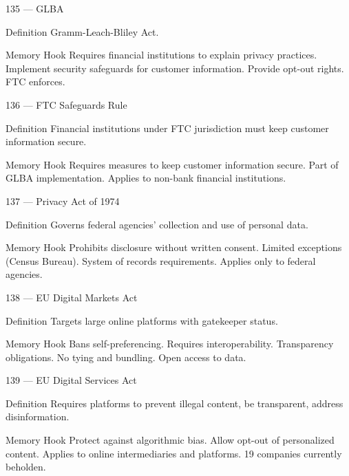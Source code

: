 \documentclass[aspectratio=169,8pt]{beamer}
\begin{document}
	\begin{frame}{135 --- GLBA}
		\begin{block}{Definition}
			Gramm-Leach-Bliley Act.
		\end{block}
		\begin{block}{Memory Hook}
			Requires financial institutions to explain privacy practices. Implement security safeguards for customer information. Provide opt-out rights. FTC enforces.
		\end{block}
	\end{frame}
	
	\begin{frame}{136 --- FTC Safeguards Rule}
		\begin{block}{Definition}
			Financial institutions under FTC jurisdiction must keep customer information secure.
		\end{block}
		\begin{block}{Memory Hook}
			Requires measures to keep customer information secure. Part of GLBA implementation. Applies to non-bank financial institutions.
		\end{block}
	\end{frame}
	
	\begin{frame}{137 --- Privacy Act of 1974}
		\begin{block}{Definition}
			Governs federal agencies' collection and use of personal data.
		\end{block}
		\begin{block}{Memory Hook}
			Prohibits disclosure without written consent. Limited exceptions (Census Bureau). System of records requirements. Applies only to federal agencies.
		\end{block}
	\end{frame}
	
	\begin{frame}{138 --- EU Digital Markets Act}
		\begin{block}{Definition}
			Targets large online platforms with gatekeeper status.
		\end{block}
		\begin{block}{Memory Hook}
			Bans self-preferencing. Requires interoperability. Transparency obligations. No tying and bundling. Open access to data.
		\end{block}
	\end{frame}
	
	\begin{frame}{139 --- EU Digital Services Act}
		\begin{block}{Definition}
			Requires platforms to prevent illegal content, be transparent, address disinformation.
		\end{block}
		\begin{block}{Memory Hook}
			Protect against algorithmic bias. Allow opt-out of personalized content. Applies to online intermediaries and platforms. 19 companies currently beholden.
		\end{block}
	\end{frame}
	
\end{document}
